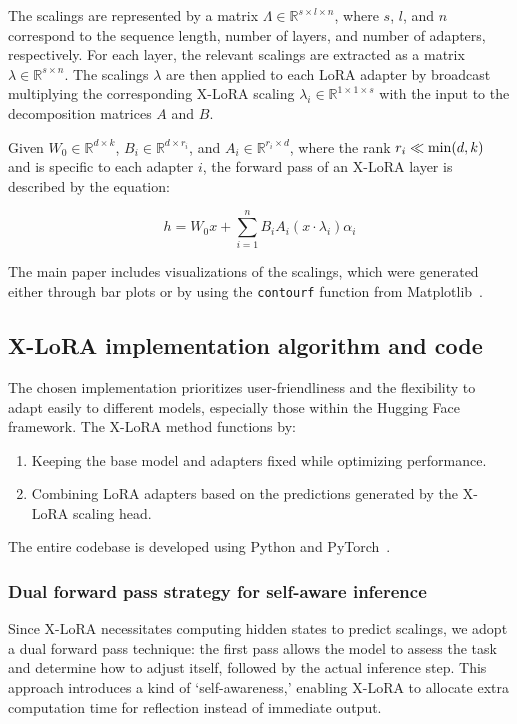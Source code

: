 The scalings are represented by a matrix $\Lambda \in \mathbb{R}^{s \times l \times n}$, where $s$, $l$, and $n$ correspond to the sequence length, number of layers, and number of adapters, respectively. For each layer, the relevant scalings are extracted as a matrix $\lambda \in \mathbb{R}^{s \times n}$. The scalings $\lambda$ are then applied to each LoRA adapter by broadcast multiplying the corresponding X-LoRA scaling $\lambda_i \in \mathbb{R}^{1\times 1 \times s}$ with the input to the decomposition matrices $A$ and $B$.

Given $W_0 \in \mathbb{R}^{d \times k}$, $B_i \in \mathbb{R}^{d \times r_i}$, and $A_i \in \mathbb{R}^{r_i \times d}$, where the rank $r_i \ll {\rm min} (d,k)$ and is specific to each adapter $i$, the forward pass of an X-LoRA layer is described by the equation:

\begin{equation}
    h = W_0x + \sum_{i=1}^{n} B_iA_i(x \cdot  \lambda_i) \alpha_i
\end{equation}

The main paper includes visualizations of the scalings, which were generated either through bar plots or by using the \texttt{contourf} function from Matplotlib~\cite{MatplotlibDocumentation}.

\subsection{X-LoRA implementation algorithm and code} The chosen implementation prioritizes user-friendliness and the flexibility to adapt easily to different models, especially those within the Hugging Face framework. The X-LoRA method functions by:

\begin{enumerate}
    \item Keeping the base model and adapters fixed while optimizing performance.
    \item Combining LoRA adapters based on the predictions generated by the X-LoRA scaling head.
\end{enumerate}

The entire codebase is developed using Python and PyTorch~\cite{Paszke2019PyTorchLibrary}.

\subsubsection{Dual forward pass strategy for self-aware inference} Since X-LoRA necessitates computing hidden states to predict scalings, we adopt a dual forward pass technique: the first pass allows the model to assess the task and determine how to adjust itself, followed by the actual inference step. This approach introduces a kind of ‘self-awareness,’ enabling X-LoRA to allocate extra computation time for reflection instead of immediate output.

